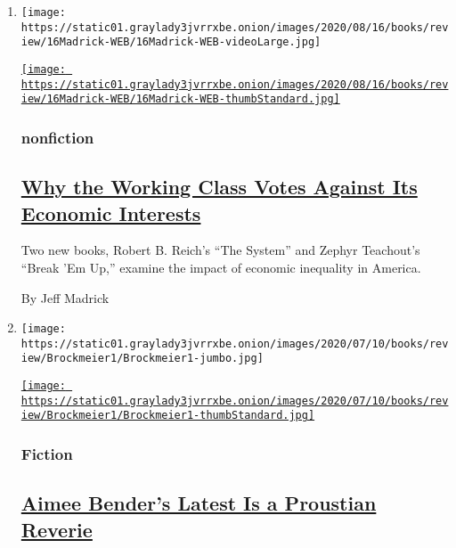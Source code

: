 \begin{enumerate}
\def\labelenumi{\arabic{enumi}.}
\item
  \texttt{[image: https://static01.graylady3jvrrxbe.onion/images/2020/08/16/books/review/16Madrick-WEB/16Madrick-WEB-videoLarge.jpg]}

  \href{/2020/07/31/books/review/the-system-robert-reich-break-em-up-zephyr-teachout.html}{\texttt{[image: https://static01.graylady3jvrrxbe.onion/images/2020/08/16/books/review/16Madrick-WEB/16Madrick-WEB-thumbStandard.jpg]}}

  \hypertarget{nonfiction}{%
  \subsubsection{nonfiction}\label{nonfiction}}

  \hypertarget{why-the-working-class-votes-against-its-economic-interests}{%
  \subsection{\texorpdfstring{\href{/2020/07/31/books/review/the-system-robert-reich-break-em-up-zephyr-teachout.html}{Why
  the Working Class Votes Against Its Economic
  Interests}}{Why the Working Class Votes Against Its Economic Interests}}\label{why-the-working-class-votes-against-its-economic-interests}}

  Two new books, Robert B. Reich's ``The System'' and Zephyr Teachout's
  ``Break 'Em Up,'' examine the impact of economic inequality in
  America.

  By Jeff Madrick
\item
  \texttt{[image: https://static01.graylady3jvrrxbe.onion/images/2020/07/10/books/review/Brockmeier1/Brockmeier1-jumbo.jpg]}

  \href{/2020/07/28/books/review/aimee-bender-the-butterfly-lampshade.html}{\texttt{[image: https://static01.graylady3jvrrxbe.onion/images/2020/07/10/books/review/Brockmeier1/Brockmeier1-thumbStandard.jpg]}}

  \hypertarget{fiction}{%
  \subsubsection{Fiction}\label{fiction}}

  \hypertarget{aimee-benders-latest-is-a-proustian-reverie}{%
  \subsection{\texorpdfstring{\href{/2020/07/28/books/review/aimee-bender-the-butterfly-lampshade.html}{Aimee
  Bender's Latest Is a Proustian
  Reverie}}{Aimee Bender's Latest Is a Proustian Reverie}}\label{aimee-benders-latest-is-a-proustian-reverie}}


\end{enumerate}
